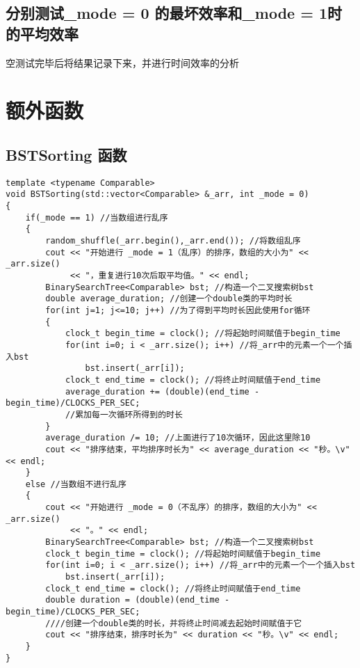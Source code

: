 \documentclass[UTF8]{ctexart}
\begin{document}
\subsection{分别测试\_mode = 0 的最坏效率和\_mode = 1时的平均效率}
\hphantom 空测试完毕后将结果记录下来，并进行时间效率的分析

\newpage

\section{额外函数}

\subsection{BSTSorting 函数}

\begin{lstlisting}[language={[ANSI]C++}]
template <typename Comparable>
void BSTSorting(std::vector<Comparable> &_arr, int _mode = 0)
{
    if(_mode == 1) //当数组进行乱序
    {
        random_shuffle(_arr.begin(),_arr.end()); //将数组乱序
        cout << "开始进行 _mode = 1（乱序）的排序，数组的大小为" << _arr.size() 
             << "，重复进行10次后取平均值。" << endl;
        BinarySearchTree<Comparable> bst; //构造一个二叉搜索树bst
        double average_duration; //创建一个double类的平均时长
        for(int j=1; j<=10; j++) //为了得到平均时长因此使用for循环
        {
            clock_t begin_time = clock(); //将起始时间赋值于begin_time
            for(int i=0; i < _arr.size(); i++) //将_arr中的元素一个一个插入bst
                bst.insert(_arr[i]); 
            clock_t end_time = clock(); //将终止时间赋值于end_time
            average_duration += (double)(end_time - begin_time)/CLOCKS_PER_SEC; 
            //累加每一次循环所得到的时长
        }
        average_duration /= 10; //上面进行了10次循环，因此这里除10
        cout << "排序结束，平均排序时长为" << average_duration << "秒。\v" << endl;
    }
    else //当数组不进行乱序
    {
        cout << "开始进行 _mode = 0（不乱序）的排序，数组的大小为" << _arr.size() 
             << "。" << endl;
        BinarySearchTree<Comparable> bst; //构造一个二叉搜索树bst
        clock_t begin_time = clock(); //将起始时间赋值于begin_time
        for(int i=0; i < _arr.size(); i++) //将_arr中的元素一个一个插入bst
            bst.insert(_arr[i]);
        clock_t end_time = clock(); //将终止时间赋值于end_time
        double duration = (double)(end_time - begin_time)/CLOCKS_PER_SEC;
        ////创建一个double类的时长，并将终止时间减去起始时间赋值于它
        cout << "排序结束，排序时长为" << duration << "秒。\v" << endl;
    }
}
\end{lstlisting}
\end{document}
